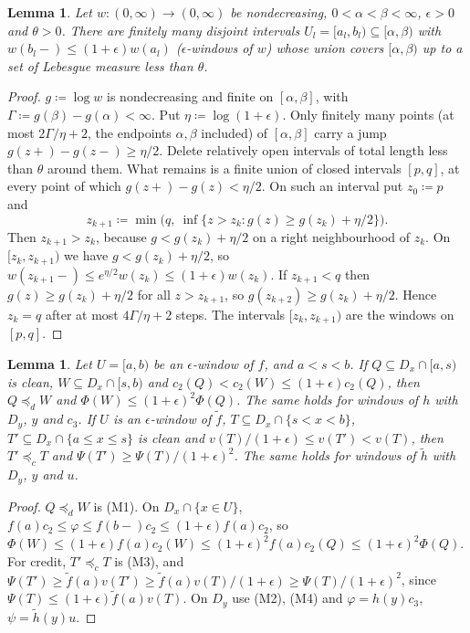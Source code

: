 \documentclass[11pt]{article}
\newtheorem{lemma}[theorem]{Lemma}
\theoremstyle{definition}\newtheorem{definition}[theorem]{Definition}
\theoremstyle{remark}\newtheorem{remark}[theorem]{Remark}
\newcommand{\ftil}{\tilde f}
\newcommand{\htil}{\tilde h}
\begin{document}
\begin{lemma}\label{lem:windows}
Let $w\colon(0,\infty)\to(0,\infty)$ be nondecreasing, $0<\alpha<\beta<\infty$,
$\epsilon>0$ and $\theta>0$. There are finitely many disjoint intervals
$U_l=[a_l,b_l)\subseteq[\alpha,\beta)$ with $w(b_l-)\le(1+\epsilon)w(a_l)$
(\emph{$\epsilon$-windows} of $w$) whose union covers $[\alpha,\beta)$ up to a
set of Lebesgue measure less than $\theta$.
\end{lemma}
\begin{proof}
$g\coloneqq\log w$ is nondecreasing and finite on $[\alpha,\beta]$, with
$\Gamma\coloneqq g(\beta)-g(\alpha)<\infty$. Put
$\eta\coloneqq\log(1+\epsilon)$. Only finitely many points (at most
$2\Gamma/\eta+2$, the endpoints $\alpha,\beta$ included) of
$[\alpha,\beta]$ carry a jump $g(z+)-g(z-)\ge\eta/2$. Delete relatively open
intervals of total length less than $\theta$ around them. What remains is a
finite union of closed intervals $[p,q]$, at every point of which
$g(z+)-g(z)<\eta/2$. On such an interval put $z_0\coloneqq p$ and
\[
 z_{k+1}\coloneqq\min\bigl(q,\ \inf\{z>z_k:g(z)\ge g(z_k)+\eta/2\}\bigr).
\]
Then $z_{k+1}>z_k$, because $g<g(z_k)+\eta/2$ on a right neighbourhood of
$z_k$. On $[z_k,z_{k+1})$ we have $g<g(z_k)+\eta/2$, so
$w(z_{k+1}-)\le e^{\eta/2}w(z_k)\le(1+\epsilon)w(z_k)$. If $z_{k+1}<q$ then
$g(z)\ge g(z_k)+\eta/2$ for all $z>z_{k+1}$, so $g(z_{k+2})\ge
g(z_k)+\eta/2$. Hence $z_k=q$ after at most $4\Gamma/\eta+2$ steps. The
intervals $[z_k,z_{k+1})$ are the windows on $[p,q]$.
\end{proof}

\begin{lemma}\label{lem:windowmoves}
Let $U=[a,b)$ be an $\epsilon$-window of $f$, and $a<s<b$. If
$Q\subseteq D_x\cap[a,s)$ is clean, $W\subseteq D_x\cap[s,b)$ and
$c_2(Q)<c_2(W)\le(1+\epsilon)c_2(Q)$, then $Q\preceq_dW$ and
$\Phi(W)\le(1+\epsilon)^2\Phi(Q)$. The same holds for windows of $h$ with
$D_y$, $y$ and $c_3$. If $U$ is an $\epsilon$-window of $\ftil$,
$T\subseteq D_x\cap\{s<x<b\}$, $T'\subseteq D_x\cap\{a\le x\le s\}$ is clean
and $v(T)/(1+\epsilon)\le v(T')<v(T)$, then $T'\preceq_cT$ and
$\Psi(T')\ge\Psi(T)/(1+\epsilon)^2$. The same holds for windows of $\htil$
with $D_y$, $y$ and $u$.
\end{lemma}
\begin{proof}
$Q\preceq_dW$ is (M1). On $D_x\cap\{x\in U\}$,
$f(a)c_2\le\varphi\le f(b-)c_2\le(1+\epsilon)f(a)c_2$, so
$\Phi(W)\le(1+\epsilon)f(a)c_2(W)\le(1+\epsilon)^2f(a)c_2(Q)\le
(1+\epsilon)^2\Phi(Q)$. For credit, $T'\preceq_cT$ is (M3), and
$\Psi(T')\ge\ftil(a)v(T')\ge\ftil(a)v(T)/(1+\epsilon)\ge
\Psi(T)/(1+\epsilon)^2$, since $\Psi(T)\le(1+\epsilon)\ftil(a)v(T)$. On $D_y$
use (M2), (M4) and $\varphi=h(y)c_3$, $\psi=\htil(y)u$.
\end{proof}
\end{document}

